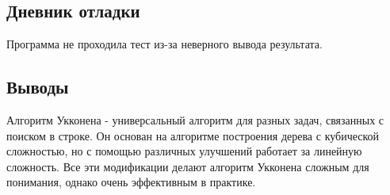 \documentclass[12pt]{article}
\begin{document}
\subsection*{Дневник отладки}

Программа не проходила тест из-за неверного вывода результата. 

\subsection*{Выводы}
Алгоритм Укконена - универсальный алгоритм для разных задач, связанных с поиском в строке. Он основан на алгоритме построения дерева с кубической сложностью, но с помощью различных улучшений работает за линейную сложность. Все эти модификации делают алгоритм Укконена сложным для понимания, однако очень эффективным в практике.
\end{document}
